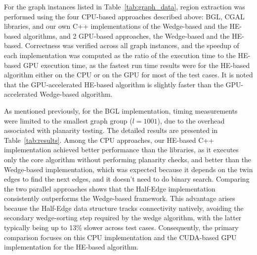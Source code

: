 \documentclass[conference]{IEEEtran}
\begin{document}

For the graph instances listed in Table~\ref{tab:graph_data}, region extraction was performed using the four CPU-based approaches described above: BGL, CGAL libraries, and our own C++ implementations of the Wedge-based and the HE-based algorithms, and 2 GPU-based approaches, the Wedge-based and the HE-based. Correctness was verified across all graph instances, and the speedup of each implementation was computed as the ratio of the execution time to the HE-based GPU execution time, as the fastest run time results were for the HE-based algorithm either on the CPU or on the GPU for most of the test cases. It is noted that the GPU-accelerated HE-based algorithm is slightly faster than the GPU-accelerated Wedge-based algorithm. 

As mentioned previously, for the BGL implementation, timing measurements were limited to the smallest graph group ($l = 1001$), due to the overhead associated with planarity testing. The detailed results are presented in Table~\ref{tab:results}. Among the CPU approaches, our HE-based C++ implementation achieved better performance than the libraries, as it executes only the core algorithm without performing planarity checks, and better than the Wedge-based implementation, which was expected because it depends on the twin edges to find the next edges, and it doesn't need to do binary search. Comparing the two parallel approaches shows that the Half-Edge implementation consistently outperforms the Wedge-based framework. This advantage arises because the Half-Edge data structure tracks connectivity natively, avoiding the secondary wedge-sorting step required by the wedge algorithm, with the latter typically being up to 13\% slower across test cases. Consequently, the primary comparison focuses on this CPU implementation and the CUDA-based GPU implementation for the HE-based algorithm.
\end{document}
